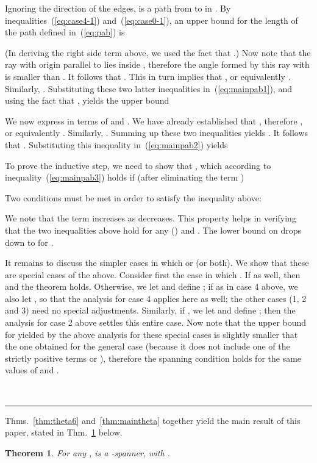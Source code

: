 \documentclass[11pt]{article}
\newtheorem{theorem}{{\bf Theorem}}
\newcommand{\qed}{\rule{0.5em}{1.5ex}}
\newcommand{\fqed}{{\hfill~\qed}}
\newenvironment{proof}{{\noindent \bf Proof.}}
                      {{\hfill \fqed} \vspace{1em}}
\begin{document}
\begin{proof}
Ignoring the direction of the edges,  is a path from  to  in . By inequalities~(\ref{eq:case4-1}) and~(\ref{eq:case0-1}), an upper bound for the length of the path  defined in~(\ref{eq:pab}) is

(In deriving the right side term above, we used the fact that .)
Now note that the ray with origin  parallel to  lies inside , therefore the angle formed by this ray with  is smaller than . It follows that . This in turn implies that
, or equivalently . Similarly,
. Substituting these two latter inequalities in~(\ref{eq:mainpab1}), and using
the fact that , yields the upper bound

We now express  in terms of  and . We have already established that
, therefore , or equivalently . Similarly,
. Summing up these two inequalities yields . It follows that . Substituting this inequality in~(\ref{eq:mainpab2}) yields

To prove the inductive step, we need to show that , which according to inequality~(\ref{eq:mainpab3}) holds if (after eliminating the term )

Two conditions must be met in order to satisfy the inequality above:

We note that the term  increases as  decreases. This property helps in verifying that the two inequalities above hold for any  () and . The lower bound on  drops down to  for .

\medskip
\noindent
It remains to discuss the simpler cases in which  or  (or both). We show that these are special cases of the above. Consider first the case in which . If  as well, then  and the theorem holds. Otherwise, we let  and define ; if  as in case 4 above, we also let , so that the analysis for case 4 applies here as well; the other cases (1, 2 and 3) need no special adjustments. Similarly, if , we let  and define ; then the analysis for case 2 above settles this entire case.  Now note that the upper bound for  yielded by the above analysis for these special cases is slightly smaller that the one obtained for the general case (because it does not include one of the strictly positive terms  or ), therefore the spanning condition  holds for the same values of  and .
\end{proof}

\medskip
\noindent
Thms.~\ref{thm:theta6} and~\ref{thm:maintheta} together yield the main result of this paper, stated in Thm.~\ref{thm:main} below.
\begin{theorem}
For any ,  is a -spanner, with .
\label{thm:main}
\end{theorem}
\end{document}
